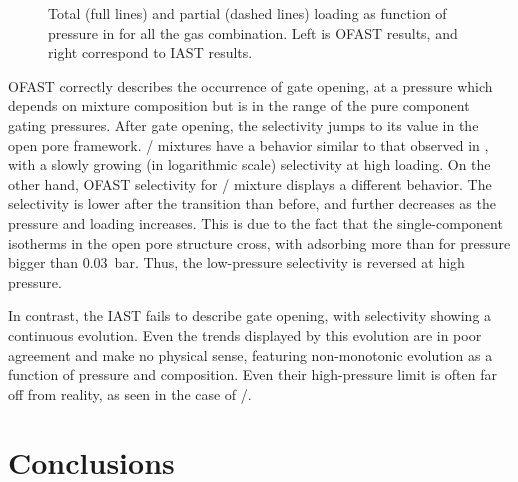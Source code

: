 \documentclass[thesis]{subfiles}
\begin{document}
\begin{figure}[htp]
    \centering
    
    \caption{Total (full lines) and partial (dashed lines) loading as function
    of pressure in \RPMZn for all the gas combination. Left is OFAST results,
    and right correspond to IAST results.}
    \label{fig:rpm3-zn:iast-ofast:loadings}
\end{figure}

OFAST correctly describes the occurrence of gate opening, at a pressure which
depends on mixture composition but is in the range of the pure component gating
pressures. After gate opening, the selectivity jumps to its value in the open
pore framework. / mixtures have a behavior similar to that
observed in \Cudhbc, with a slowly growing (in logarithmic scale) selectivity at
high loading. On the other hand, OFAST selectivity for /
mixture displays a different behavior. The selectivity is lower after the
transition than before, and further decreases as the pressure and loading
increases. This is due to the fact that the single-component isotherms  in the
open pore structure cross, with  adsorbing more than  for
pressure bigger than \SI{0.03}{bar}. Thus, the low-pressure selectivity is
reversed at high pressure.

In contrast, the IAST fails to describe gate opening, with selectivity showing a
continuous evolution. Even the trends displayed by this evolution are in poor
agreement and make no physical sense, featuring non-monotonic evolution as a
function of pressure and composition. Even their high-pressure limit is often
far off from reality, as seen in the case of /.

\section*{Conclusions}
\end{document}
